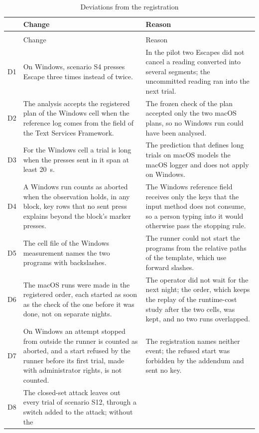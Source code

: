 {\tablebodyfont
\begin{longtable}{L{0.08}L{0.46}L{0.46}}
\caption{Deviations from the registration}
\label{tab:deviations}\\
\toprule
& Change & Reason \\
\midrule
\endfirsthead
{}\\
\toprule
& Change & Reason \\
\midrule
\endhead
D1 & On Windows, scenario S4 presses Escape three times instead of twice. &
In the pilot two Escapes did not cancel a reading converted into several segments; the uncommitted reading ran into
the next trial. \\
D2 & The analysis accepts the registered plan of the Windows cell when the reference log comes from the field of the
Text Services Framework. &
The frozen check of the plan accepted only the two macOS plans, so no Windows run could have been analysed. \\
D3 & For the Windows cell a trial is long when the presses sent in it span at least 20~s. &
The prediction that defines long trials on macOS models the macOS logger and does not apply on Windows. \\
D4 & A Windows run counts as aborted when the observation holds, in any block, key rows that no sent press explains
beyond the block's marker presses. &
The Windows reference field receives only the keys that the input method does not consume, so a person typing into it
would otherwise pass the stopping rule. \\
D5 & The cell file of the Windows measurement names the two programs with backslashes. &
The runner could not start the programs from the relative paths of the template, which use forward slashes. \\
D6 & The macOS runs were made in the registered order, each started as soon as the check of the one before it was
done, not on separate nights. &
The operator did not wait for the next night; the order, which keeps the replay of the runtime-cost study after the
two cells, was kept, and no two runs overlapped. \\
D7 & On Windows an attempt stopped from outside the runner is counted as aborted, and a start refused by the runner
before its first trial, made with administrator rights, is not counted. &
The registration names neither event; the refused start was forbidden by the addendum and sent no key. \\
D8 & The closed-set attack leaves out every trial of scenario S12, through a switch added to the attack; without the

\end{longtable}}
